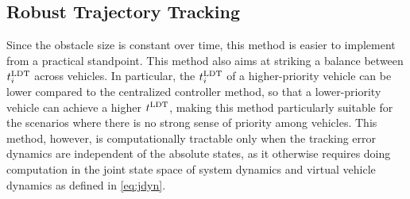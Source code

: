 \subsection{Robust Trajectory Tracking}
Since the obstacle size is constant over time, this method is easier to implement from a practical standpoint. This method also aims at striking a balance between $t^\text{LDT}_i$ across vehicles. In particular, the $t^\text{LDT}_i$ of a higher-priority vehicle can be lower compared to the centralized controller method, so that a lower-priority vehicle can achieve a higher $t^\text{LDT}$, making this method particularly suitable for the scenarios where there is no strong sense of priority among vehicles. This method, however, is computationally tractable only when the tracking error dynamics are independent of the absolute states, as it otherwise requires doing computation in the joint state space of system dynamics and virtual vehicle dynamics as defined in \eqref{eq:jdyn}. 